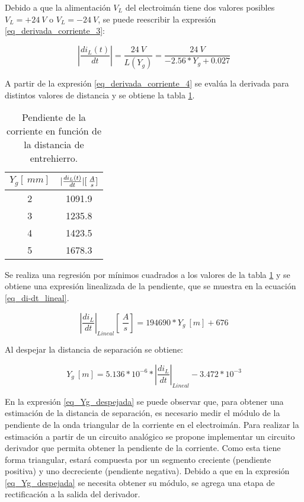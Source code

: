 Debido a que la alimentación $V_L$ del electroimán tiene dos valores posibles $V_L=+24\:V$ o $V_L=-24\:V$, se puede reescribir la expresión \ref{eq_derivada_corriente_3}:

\begin{equation} \label{eq_derivada_corriente_4}
	\left|\frac{di_L(t)}{dt}\right|= \frac{24\:V}{L(Y_g)}=\frac{24\:V}{-2.56*Y_{g}+0.027}
\end{equation}

A partir de la expresión \ref{eq_derivada_corriente_4} se evalúa la derivada para distintos valores de distancia y se obtiene la tabla \ref{tab_derivada_linealizada}.

\begin{table}[H]
	\begin{center}
		\begin{tabular}{| c | c |}
			\hline
			$Y_g[\:mm]$ & $\lvert\frac{di_L(t)}{dt}\rvert [\:\frac{A}{s}]$\\ \hline
			2 & 1091.9 \\ \hline 
			3 & 1235.8 \\ \hline 
			4 & 1423.5 \\ \hline 
			5 & 1678.3 \\ \hline 
		\end{tabular}
		\caption{Pendiente de la corriente en función de la distancia de entrehierro.}
		\label{tab_derivada_linealizada}
	\end{center}
\end{table}

Se realiza una regresión por mínimos cuadrados a los valores de la tabla \ref{tab_derivada_linealizada} y se obtiene una expresión linealizada de la pendiente, que se  muestra en la ecuación \ref{eq_di-dt_lineal}.


\begin{equation} \label{eq_di-dt_lineal}
	{\left|\frac{di_L}{dt}\right|}_{Lineal}[\:\frac{A}{s}]= 194690 * Y_g\:[m]+676
\end{equation}

Al despejar la distancia de separación se obtiene:

\begin{equation} \label{eq_Yg_despejada}
	Y_g\:[m] =5.136*10^{-6}*{\left|\frac{di_L}{dt}\right|}_{Lineal} - 3.472*10^{-3}
\end{equation}


En la expresión \ref{eq_Yg_despejada} se puede observar que, para obtener una estimación de la distancia de separación, es necesario medir el módulo de la pendiente de la onda triangular de la corriente en el electroimán. Para realizar la estimación a partir de un circuito analógico se propone implementar un circuito derivador que permita obtener la pendiente de la corriente. Como esta tiene forma triangular, estará compuesta por un segmento creciente (pendiente positiva) y uno decreciente (pendiente negativa). Debido a que en la expresión \ref{eq_Yg_despejada} se necesita obtener su módulo, se agrega una etapa de rectificación a la salida del derivador.

